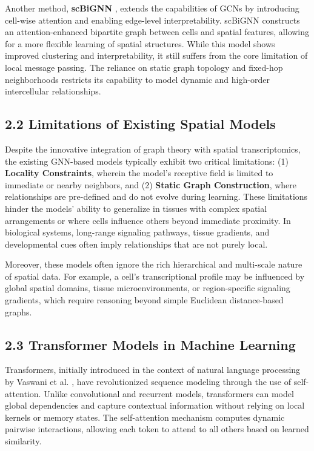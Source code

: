 \documentclass[unnumsec,webpdf,contemporary,medium]{oup-authoring-template}
\begin{document}
Another method, \textbf{scBiGNN} \cite{scbignn}, extends the capabilities of GCNs by introducing cell-wise attention and enabling edge-level interpretability. scBiGNN constructs an attention-enhanced bipartite graph between cells and spatial features, allowing for a more flexible learning of spatial structures. While this model shows improved clustering and interpretability, it still suffers from the core limitation of local message passing. The reliance on static graph topology and fixed-hop neighborhoods restricts its capability to model dynamic and high-order intercellular relationships.

\subsection*{2.2 Limitations of Existing Spatial Models}
Despite the innovative integration of graph theory with spatial transcriptomics, the existing GNN-based models typically exhibit two critical limitations: (1) \textbf{Locality Constraints}, wherein the model’s receptive field is limited to immediate or nearby neighbors, and (2) \textbf{Static Graph Construction}, where relationships are pre-defined and do not evolve during learning. These limitations hinder the models’ ability to generalize in tissues with complex spatial arrangements or where cells influence others beyond immediate proximity. In biological systems, long-range signaling pathways, tissue gradients, and developmental cues often imply relationships that are not purely local.

Moreover, these models often ignore the rich hierarchical and multi-scale nature of spatial data. For example, a cell’s transcriptional profile may be influenced by global spatial domains, tissue microenvironments, or region-specific signaling gradients, which require reasoning beyond simple Euclidean distance-based graphs.

\subsection*{2.3 Transformer Models in Machine Learning}
Transformers, initially introduced in the context of natural language processing by Vaswani et al. \cite{vaswani2017attention}, have revolutionized sequence modeling through the use of self-attention. Unlike convolutional and recurrent models, transformers can model global dependencies and capture contextual information without relying on local kernels or memory states. The self-attention mechanism computes dynamic pairwise interactions, allowing each token to attend to all others based on learned similarity.
\end{document}
